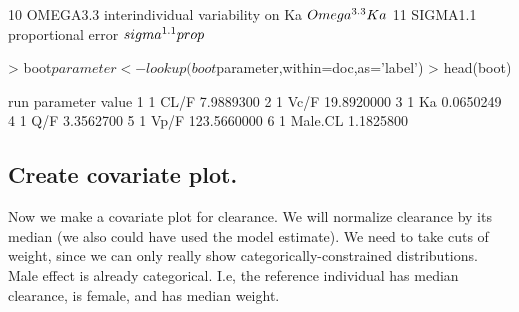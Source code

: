 \begin{Schunk}
\begin{Soutput}
10  OMEGA3.3             interindividual variability on Ka   $\\Omega^{3.3}Ka$
11  SIGMA1.1                            proportional error $\\sigma^{1.1}prop$
\end{Soutput}
\begin{Sinput}
> boot$parameter <- lookup(boot$parameter,within=doc,as='label')
> head(boot)
\end{Sinput}
\begin{Soutput}
  run parameter       value
1   1      CL/F   7.9889300
2   1      Vc/F  19.8920000
3   1        Ka   0.0650249
4   1       Q/F   3.3562700
5   1      Vp/F 123.5660000
6   1   Male.CL   1.1825800
\end{Soutput}
\end{Schunk}
\subsection{Create covariate plot.}
Now we make a covariate plot for clearance.  We will normalize clearance 
by its median (we also could have used the model estimate).  We need to take 
cuts of weight, since we can only really show categorically-constrained distributions.
Male effect is already categorical.  I.e, the reference individual has median
clearance, is female, and has median weight.

